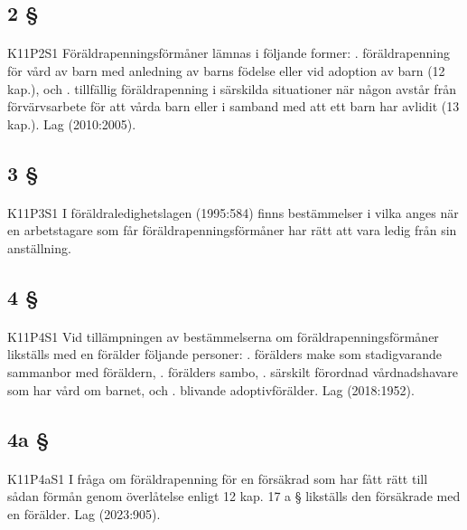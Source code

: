\documentclass[a4paper,notitlepage,openany,10pt]{book}
\begin{document}
\subsection*{2 §}
\paragraph*{}
{\tiny K11P2S1}
Föräldrapenningsförmåner lämnas i följande former:
. föräldrapenning för vård av barn med anledning av barns födelse eller vid adoption av barn (12 kap.), och
. tillfällig föräldrapenning i särskilda situationer när någon avstår från förvärvsarbete för att vårda barn eller i samband med att ett barn har avlidit (13 kap.).
Lag (2010:2005).
\subsection*{3 §}
\paragraph*{}
{\tiny K11P3S1}
I föräldraledighetslagen (1995:584) finns bestämmelser i vilka anges när en arbetstagare som får föräldrapenningsförmåner har rätt att vara ledig från sin anställning.
\subsection*{4 §}
\paragraph*{}
{\tiny K11P4S1}
Vid tillämpningen av bestämmelserna om föräldrapenningsförmåner likställs med en förälder följande personer:
. förälders make som stadigvarande sammanbor med föräldern,
. förälders sambo,
. särskilt förordnad vårdnadshavare som har vård om barnet, och
. blivande adoptivförälder.
Lag (2018:1952).
\subsection*{4a §}
\paragraph*{}
{\tiny K11P4aS1}
I fråga om föräldrapenning för en försäkrad som har fått rätt till sådan förmån genom överlåtelse enligt 12 kap. 17 a § likställs den försäkrade med en förälder.
Lag (2023:905).
\end{document}
